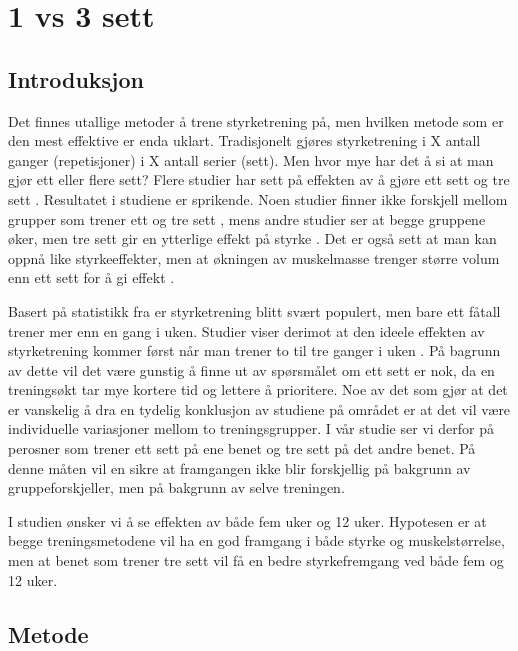 \documentclass[
]{book}
\begin{document}
\hypertarget{vs-3-sett}{%
\chapter{1 vs 3 sett}\label{vs-3-sett}}

\hypertarget{introduksjon-2}{%
\section{Introduksjon}\label{introduksjon-2}}

Det finnes utallige metoder å trene styrketrening på, men hvilken metode som er den mest effektive er enda uklart. Tradisjonelt gjøres styrketrening i X antall ganger (repetisjoner) i X antall serier (sett). Men hvor mye har det å si at man gjør ett eller flere sett? Flere studier har sett på effekten av å gjøre ett sett og tre sett \citep{galvão2005, hass2000, krieger2009, radaelli2014, schoenfeld2019}. Resultatet i studiene er sprikende. Noen studier finner ikke forskjell mellom grupper som trener ett og tre sett \citep{hass2000, radaelli2014}, mens andre studier ser at begge gruppene øker, men tre sett gir en ytterlige effekt på styrke \citep{krieger2009, galvão2005}. Det er også sett at man kan oppnå like styrkeeffekter, men at økningen av muskelmasse trenger større volum enn ett sett for å gi effekt \citep{schoenfeld2019}.

Basert på statistikk fra \citet{statistisksentralbyrå2019} er styrketrening blitt svært populert, men bare ett fåtall trener mer enn en gang i uken. Studier viser derimot at den ideele effekten av styrketrening kommer først når man trener to til tre ganger i uken \citep{schoenfeld2016}. På bagrunn av dette vil det være gunstig å finne ut av spørsmålet om ett sett er nok, da en treningsøkt tar mye kortere tid og lettere å prioritere. Noe av det som gjør at det er vanskelig å dra en tydelig konklusjon av studiene på området er at det vil være individuelle variasjoner mellom to treningsgrupper. I vår studie ser vi derfor på perosner som trener ett sett på ene benet og tre sett på det andre benet. På denne måten vil en sikre at framgangen ikke blir forskjellig på bakgrunn av gruppeforskjeller, men på bakgrunn av selve treningen.

I studien ønsker vi å se effekten av både fem uker og 12 uker. Hypotesen er at begge treningsmetodene vil ha en god framgang i både styrke og muskelstørrelse, men at benet som trener tre sett vil få en bedre styrkefremgang ved både fem og 12 uker.

\hypertarget{metode-2}{%
\section{Metode}\label{metode-2}}
\end{document}
